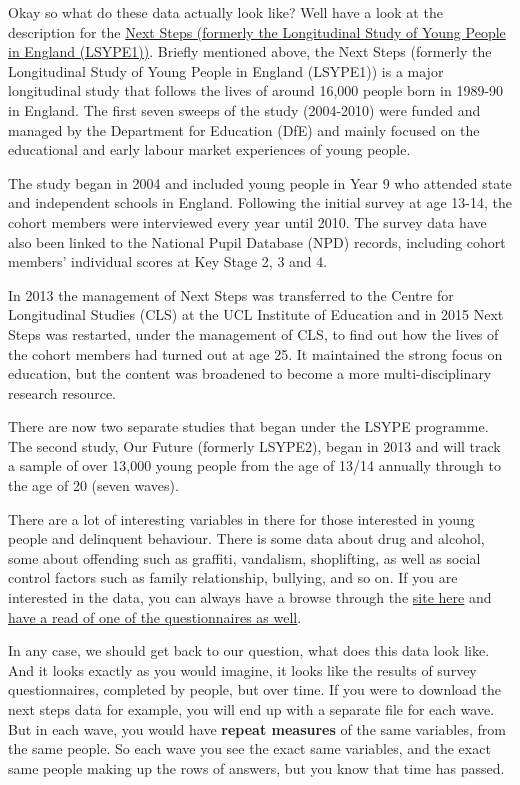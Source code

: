 \documentclass[
]{book}
\begin{document}
Okay so what do these data actually look like? Well have a look at the description for the \href{https://discover.ukdataservice.ac.uk/series/?sn=2000030}{Next Steps (formerly the Longitudinal Study of Young People in England (LSYPE1))}. Briefly mentioned above, the Next Steps (formerly the Longitudinal Study of Young People in England (LSYPE1)) is a major longitudinal study that follows the lives of around 16,000 people born in 1989-90 in England. The first seven sweeps of the study (2004-2010) were funded and managed by the Department for Education (DfE) and mainly focused on the educational and early labour market experiences of young people.

The study began in 2004 and included young people in Year 9 who attended state and independent schools in England. Following the initial survey at age 13-14, the cohort members were interviewed every year until 2010. The survey data have also been linked to the National Pupil Database (NPD) records, including cohort members' individual scores at Key Stage 2, 3 and 4.

In 2013 the management of Next Steps was transferred to the Centre for Longitudinal Studies (CLS) at the UCL Institute of Education and in 2015 Next Steps was restarted, under the management of CLS, to find out how the lives of the cohort members had turned out at age 25. It maintained the strong focus on education, but the content was broadened to become a more multi-disciplinary research resource.

There are now two separate studies that began under the LSYPE programme. The second study, Our Future (formerly LSYPE2), began in 2013 and will track a sample of over 13,000 young people from the age of 13/14 annually through to the age of 20 (seven waves).

There are a lot of interesting variables in there for those interested in young people and delinquent behaviour. There is some data about drug and alcohol, some about offending such as graffiti, vandalism, shoplifting, as well as social control factors such as family relationship, bullying, and so on. If you are interested in the data, you can always have a browse through the \href{https://discover.ukdataservice.ac.uk/Catalogue/?sn=5545\&type=Data\%20catalogue\&lt}{site here} and \href{http://doc.ukdataservice.ac.uk/doc/5545/mrdoc/pdf/5545age_25_survey_questionnaire.pdf}{have a read of one of the questionnaires as well}.

In any case, we should get back to our question, what does this data look like. And it looks exactly as you would imagine, it looks like the results of survey questionnaires, completed by people, but over time. If you were to download the next steps data for example, you will end up with a separate file for each wave. But in each wave, you would have \textbf{repeat measures} of the same variables, from the same people. So each wave you see the exact same variables, and the exact same people making up the rows of answers, but you know that time has passed.
\end{document}
